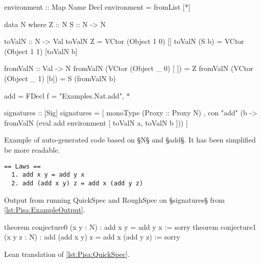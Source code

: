 \begin{listing}[H]
\begin{HaskellCode}
environment :: Map Name Decl
environment = fromList [*\truncated*]

data N where
  Z :: N
  S :: N -> N

toValN :: N -> Val
toValN Z = VCtor (Object 1 0) []
toValN (S b) = VCtor (Object 1 1) [toValN b]

fromValN :: Val -> N
fromValN (VCtor (Object _ 0) [ ]) = Z
fromValN (VCtor (Object _ 1) [b]) = S (fromValN b)

add = FDecl {f = "Examples.Nat.add", *\truncated*}

signatures :: [Sig]
signatures =
  [ monoType (Proxy :: Proxy N)
  , con "add" (\a b -> fromValN (eval add environment
                                [ toValN a, toValN b ]))
  ]
\end{HaskellCode}
\caption
  [Example of auto-generated code based on §N§ and §add§.]
  {Example of auto-generated code based on §N§ and §add§. It has been simplified be more readable.}
\label{lst:Pisa:ExampleOutput}
\end{listing}


\begin{listing}[H]
\begin{verbatim}
== Laws ==
  1. add x y = add y x
  2. add (add x y) z = add x (add y z)
\end{verbatim}
\caption
  [Output from running QuickSpec and RoughSpec on \cref{lst:Pisa:ExampleOutput}.]
  {Output from running QuickSpec and RoughSpec on §signatures§ from \cref{lst:Pisa:ExampleOutput}.}
\label{lst:Pisa:QuickSpec}
\end{listing}

\begin{listing}[H]
\begin{LeanCode}
theorem conjecture0 (x y : N) :
  add x y = add y x := sorry
theorem conjecture1 (x y z : N) :
  add (add x y) z = add x (add y z) := sorry
\end{LeanCode}
\caption {Lean translation of \cref{lst:Pisa:QuickSpec}.}
\label{lst:Pisa:LeanVersion}
\end{listing}
